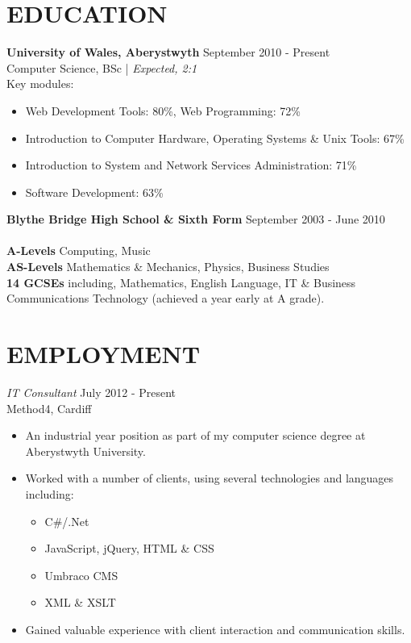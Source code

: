 \documentclass[line,margin]{res}
\begin{document}
\begin{resume}
\section{EDUCATION} {\bf University of Wales, Aberystwyth} \hfill September 2010 - Present\\
               Computer Science, BSc | {\sl Expected, 2:1}\\
Key modules: 
\begin{itemize} \itemsep -2pt
\item Web Development Tools: 80\%, Web Programming: 72\%
\item Introduction to Computer Hardware, Operating Systems \& Unix Tools: 67\%
\item Introduction to System and Network Services Administration: 71\%
\item Software Development: 63\%\\
\end{itemize}
{\bf Blythe Bridge High School \& Sixth Form} \hfill September 2003 - June 2010 \\ \\
{\bf A-Levels} Computing, Music\\
{\bf AS-Levels} Mathematics \& Mechanics, Physics, Business Studies\\
{\bf 14 GCSEs} including, Mathematics, English Language, IT \& Business Communications Technology (achieved a year early at A grade).

\newpage
\section{EMPLOYMENT}
	{\sl IT Consultant} \hfill July 2012 - Present \\
	Method4, Cardiff
	\begin{itemize} \itemsep -2pt
		\item An industrial year position as part of my computer science degree at Aberystwyth University.
		\item Worked with a number of clients, using several technologies and languages including:
		\begin{itemize}
			\item C\#/.Net
			\item JavaScript, jQuery, HTML \& CSS
			\item Umbraco CMS
			\item XML \& XSLT
		\end{itemize}
		\item Gained valuable experience with client interaction and communication skills.
	\end{itemize}


\end{resume}
\end{document}
